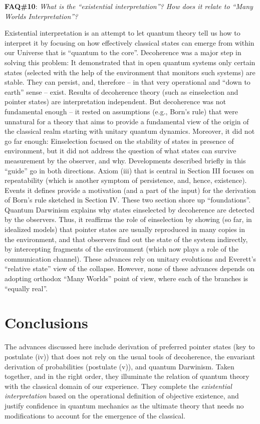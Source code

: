 \documentclass[aps,amsmath,amssymb,amsfonts,12pt]{revtex4-1}
\newcommand{\+}         {\dagger}
\begin{document}
{{{{\bf FAQ\#10}: {\it What is the ``existential interpretation''? How does it relate to ``Many Worlds Interpretation''?}

Existential interpretation is an attempt to let quantum theory tell us how to interpret it by focusing on how effectively classical states can emerge from within our Universe that is ``quantum to the core''. Decoherence was a major step in solving this problem: It demonstrated that in open quantum systems only certain states (selected with the help of the environment that monitors such systems) are stable. They can persist, and, therefore -- in that very operational and ``down to earth'' sense -- exist. Results of decoherence theory (such as einselection and pointer states) are interpretation independent. But decoherence was not fundamental enough -- it rested on assumptions (e.g., Born's rule) that were unnatural for a theory that aims to provide a fundamental view of the origin of the classical realm starting with unitary quantum dynamics. Moreover, it did not go far enough: Einselection focused on the stability of states in presence of environment, but it did not address the question of what states can survive measurement by the observer, and why. Developments described briefly in this ``guide''  go in both directions. Axiom (iii) that is central in Section III focuses on repeatability (which is another symptom of persistence, and, hence, existence). Events it defines provide a motivation (and a part of the input) for the derivation of Born's rule sketched in Section IV. These two section shore up ``foundations''. Quantum Darwinism explains why states einselected by decoherence are detected by the observers. Thus, it reaffirms the role of einselection by showing (so far, in idealized models) that pointer states are usually reproduced in many copies in the environment, and that observers find out the state of the system indirectly, by intercepting fragments of the environment (which now plays a role of the communication channel). These advances rely on unitary evolutions and Everett's ``relative state'' view of the collapse. However, none of these advances depends on adopting orthodox ``Many Worlds'' point of view, where each of the branches is ``equally real''.

\section{Conclusions}

The advances discussed here include derivation of preferred pointer states (key to postulate (iv)) that does not rely on the usual tools of decoherence,
the envariant derivation of probabilities (postulate (v)), and quantum Darwinism. Taken together, and in the right order, they illuminate the relation
of quantum theory with the classical domain of our experience. They complete the
{\it existential interpretation} based on the operational definition of objective existence, and justify confidence in quantum mechanics as the ultimate theory that needs no modifications to account
for the emergence of the classical.

}}}
\end{document}
